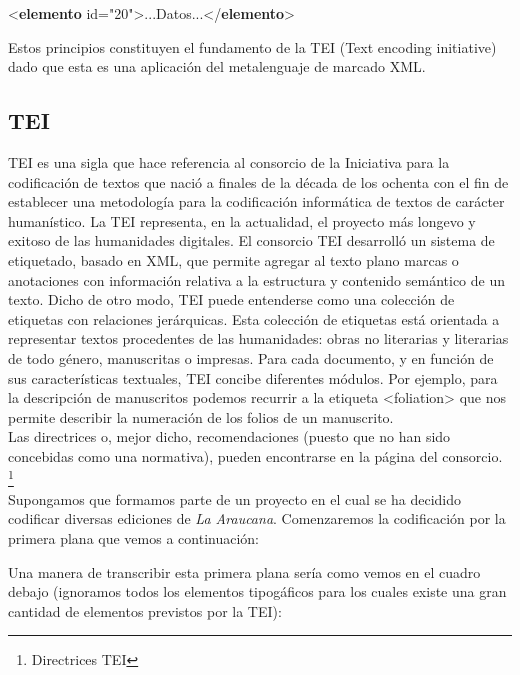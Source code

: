 \documentclass[
]{book}
\newenvironment{Shaded}{\begin{snugshade}}{\end{snugshade}}
\newcommand{\KeywordTok}[1]{\textcolor[rgb]{0.13,0.29,0.53}{\textbf{#1}}}
\newcommand{\NormalTok}[1]{#1}
\newcommand{\OtherTok}[1]{\textcolor[rgb]{0.56,0.35,0.01}{#1}}
\newcommand{\StringTok}[1]{\textcolor[rgb]{0.31,0.60,0.02}{#1}}
\begin{document}
\begin{Shaded}
\begin{Highlighting}[]
\NormalTok{\textless{}}\KeywordTok{elemento}\OtherTok{ id=}\StringTok{"20"}\NormalTok{\textgreater{}...Datos...\textless{}/}\KeywordTok{elemento}\NormalTok{\textgreater{}}
\end{Highlighting}
\end{Shaded}

Estos principios constituyen el fundamento de la TEI (Text encoding initiative) dado que esta es una aplicación del
metalenguaje de marcado XML.

\hypertarget{tei}{%
\subsection*{TEI}\label{tei}}

TEI es una sigla que hace referencia al consorcio de la Iniciativa para la codificación de textos que nació a finales de la década de los ochenta con el fin de establecer una metodología para la codificación informática de textos de carácter humanístico. La TEI representa, en la actualidad, el proyecto más longevo y exitoso de las humanidades digitales.
El consorcio TEI desarrolló un sistema de etiquetado, basado en XML, que permite agregar al texto plano marcas o anotaciones con información relativa a la estructura y contenido semántico de un texto.
Dicho de otro modo, TEI puede entenderse como una colección de etiquetas con relaciones jerárquicas. Esta colección de etiquetas está orientada a representar textos procedentes de las humanidades: obras no literarias y literarias de todo género, manuscritas o impresas.
Para cada documento, y en función de sus características textuales, TEI concibe diferentes módulos. Por ejemplo, para la descripción de manuscritos podemos recurrir a la etiqueta { \textless foliation\textgreater{} } que nos permite describir la numeración de los folios de un manuscrito.\\
Las directrices o, mejor dicho, recomendaciones (puesto que no han sido concebidas como una normativa), pueden encontrarse en la página del consorcio. \footnote{Directrices TEI}\\
Supongamos que formamos parte de un proyecto en el cual se ha decidido codificar diversas ediciones de \emph{La Araucana}. Comenzaremos la codificación por la primera plana que vemos a continuación:

Una manera de transcribir esta primera plana sería como vemos en el cuadro debajo (ignoramos todos los elementos tipogáficos para los cuales existe una gran cantidad de elementos previstos por la TEI):
\end{document}

